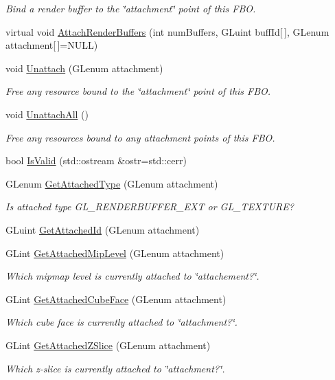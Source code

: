 \begin{DoxyCompactItemize}
\begin{DoxyCompactList}\small\item\em Bind a render buffer to the \char`\"{}attachment\char`\"{} point of this FBO. \end{DoxyCompactList}\item 
virtual void \hyperlink{class_framebuffer_object_a6e544bc8b8cbd2775fc9831ee854e4e3}{AttachRenderBuffers} (int numBuffers, GLuint buffId\mbox{[}$\,$\mbox{]}, GLenum attachment\mbox{[}$\,$\mbox{]}=NULL)
\item 
void \hyperlink{class_framebuffer_object_ae37b27bc48c8271e43a89fa94b6ad7c7}{Unattach} (GLenum attachment)
\begin{DoxyCompactList}\small\item\em Free any resource bound to the \char`\"{}attachment\char`\"{} point of this FBO. \end{DoxyCompactList}\item 
void \hyperlink{class_framebuffer_object_a45d0bbcbf43e0f97e93d290ddb275885}{UnattachAll} ()
\begin{DoxyCompactList}\small\item\em Free any resources bound to any attachment points of this FBO. \end{DoxyCompactList}\item 
bool \hyperlink{class_framebuffer_object_ac2b9348526bb9ba9d4c66473bbd7a06b}{IsValid} (std::ostream \&ostr=std::cerr)
\item 
GLenum \hyperlink{class_framebuffer_object_af6eed9070b6fe04cba7535782e54b175}{GetAttachedType} (GLenum attachment)
\begin{DoxyCompactList}\small\item\em Is attached type GL\_\-RENDERBUFFER\_\-EXT or GL\_\-TEXTURE? \end{DoxyCompactList}\item 
GLuint \hyperlink{class_framebuffer_object_a5ed03e1d45321b92a264ab1a91d78f38}{GetAttachedId} (GLenum attachment)
\item 
GLint \hyperlink{class_framebuffer_object_a6572be6d2c59a8b8fb6f3fec126f4480}{GetAttachedMipLevel} (GLenum attachment)
\begin{DoxyCompactList}\small\item\em Which mipmap level is currently attached to \char`\"{}attachement?\char`\"{}. \end{DoxyCompactList}\item 
GLint \hyperlink{class_framebuffer_object_af7fe7616b07381b294eac1ae3d6df2fa}{GetAttachedCubeFace} (GLenum attachment)
\begin{DoxyCompactList}\small\item\em Which cube face is currently attached to \char`\"{}attachment?\char`\"{}. \end{DoxyCompactList}\item 
GLint \hyperlink{class_framebuffer_object_a386de725cd22b3f4f75692c653e0ac86}{GetAttachedZSlice} (GLenum attachment)
\begin{DoxyCompactList}\small\item\em Which z-\/slice is currently attached to \char`\"{}attachment?\char`\"{}. \end{DoxyCompactList}\end{DoxyCompactItemize}
